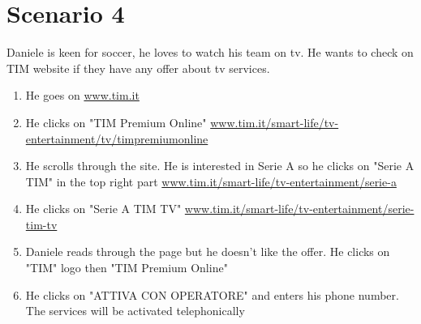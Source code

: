 \section{Scenario 4}
Daniele is keen for soccer, he loves to watch his team on tv. He wants to check on TIM website if they have any offer about tv services.

\begin{enumerate}
	\item He goes on \url{www.tim.it}
	\item He clicks on "TIM Premium Online" \url{www.tim.it/smart-life/tv-entertainment/tv/timpremiumonline}
	\item He scrolls through the site. He is interested in Serie A so he clicks on "Serie A TIM" in the top right part \url{www.tim.it/smart-life/tv-entertainment/serie-a}
	\item He clicks on "Serie A TIM TV" \url{www.tim.it/smart-life/tv-entertainment/serie-tim-tv}
	\item Daniele reads through the page but he doesn't like the offer. He clicks on "TIM" logo then "TIM Premium Online"
	\item He clicks on "ATTIVA CON OPERATORE" and enters his phone number. The services will be activated telephonically
\end{enumerate}

\newpage

